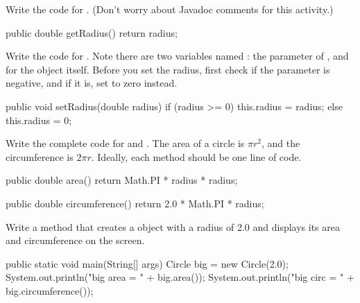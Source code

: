 \Q Write the code for . (Don't worry about Javadoc comments for this activity.)

\begin{answer}[6em]
\begin{javaans}
    public double getRadius() {
        return radius;
    }
\end{javaans}
\end{answer}


\Q Write the code for . Note there are two variables named : the parameter of , and  for the object itself. Before you set the radius, first check if the parameter is negative, and if it is, set  to zero instead.

\begin{answer}[12em]
\begin{javaans}
    public void setRadius(double radius) {
        if (radius >= 0) {
            this.radius = radius;
        }
        else {
            this.radius = 0;
        }
    }
\end{javaans}
\end{answer}


\Q Write the complete code for  and .
The area of a circle is $\pi r^2$, and the circumference is $2 \pi r$.
Ideally, each method should be one line of code.

\begin{answer}[12em]
\begin{javaans}
    public double area() {
        return Math.PI * radius * radius;
    }

    public double circumference() {
        return 2.0 * Math.PI * radius;
    }
\end{javaans}
\end{answer}


\Q \label{circmain}
Write a  method that creates a  object with a radius of 2.0 and displays its area and circumference on the screen.

\begin{answer}[8em]
\begin{javaans}
    public static void main(String[] args) {
        Circle big = new Circle(2.0);
        System.out.println("big area = " + big.area());
        System.out.println("big circ = " + big.circumference());
    }
\end{javaans}
\end{answer}
